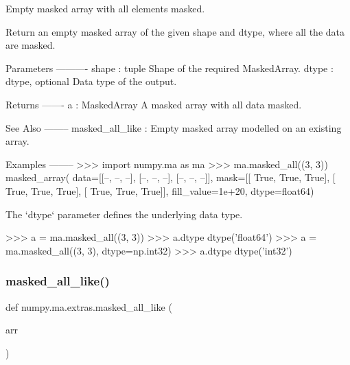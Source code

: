 \begin{DoxyVerb}Empty masked array with all elements masked.

Return an empty masked array of the given shape and dtype, where all the
data are masked.

Parameters
----------
shape : tuple
    Shape of the required MaskedArray.
dtype : dtype, optional
    Data type of the output.

Returns
-------
a : MaskedArray
    A masked array with all data masked.

See Also
--------
masked_all_like : Empty masked array modelled on an existing array.

Examples
--------
>>> import numpy.ma as ma
>>> ma.masked_all((3, 3))
masked_array(
  data=[[--, --, --],
        [--, --, --],
        [--, --, --]],
  mask=[[ True,  True,  True],
        [ True,  True,  True],
        [ True,  True,  True]],
  fill_value=1e+20,
  dtype=float64)

The `dtype` parameter defines the underlying data type.

>>> a = ma.masked_all((3, 3))
>>> a.dtype
dtype('float64')
>>> a = ma.masked_all((3, 3), dtype=np.int32)
>>> a.dtype
dtype('int32')\end{DoxyVerb}
 \mbox{\label{namespacenumpy_1_1ma_1_1extras_a7bf3347167eff6030c860d8015b63101}} 
\subsubsection{\texorpdfstring{masked\+\_\+all\+\_\+like()}{masked\_all\_like()}}
{\footnotesize\ttfamily def numpy.\+ma.\+extras.\+masked\+\_\+all\+\_\+like (\begin{DoxyParamCaption}\item[{}]{arr }\end{DoxyParamCaption})}

